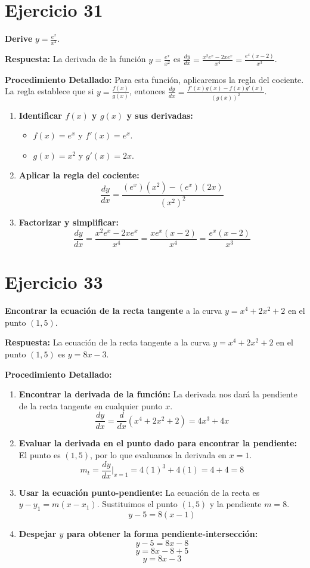 \documentclass[12pt, a4paper]{article}
\begin{document}
\section{Ejercicio 31}
\textbf{Derive} $y = \frac{e^x}{x^2}$.

\textbf{Respuesta:}
La derivada de la función $y=\frac{e^x}{x^2}$ es $\frac{dy}{dx} = \frac{x^2e^x-2xe^x}{x^4} = \frac{e^x(x-2)}{x^3}$.

\textbf{Procedimiento Detallado:}
Para esta función, aplicaremos la regla del cociente. La regla establece que si $y=\frac{f(x)}{g(x)}$, entonces $\frac{dy}{dx}=\frac{f'(x)g(x)-f(x)g'(x)}{(g(x))^2}$.
\begin{enumerate}
    \item \textbf{Identificar $f(x)$ y $g(x)$ y sus derivadas:}
    \begin{itemize}
        \item $f(x)=e^x$ y $f'(x)=e^x$.
        \item $g(x)=x^2$ y $g'(x)=2x$.
    \end{itemize}
    \item \textbf{Aplicar la regla del cociente:}
    \[\frac{dy}{dx}=\frac{(e^x)(x^2)-(e^x)(2x)}{(x^2)^2}\]
    \item \textbf{Factorizar y simplificar:}
    \[\frac{dy}{dx}=\frac{x^2e^x-2xe^x}{x^4}=\frac{xe^x(x-2)}{x^4}=\frac{e^x(x-2)}{x^3}\]
\end{enumerate}

\section{Ejercicio 33}
\textbf{Encontrar la ecuación de la recta tangente} a la curva $y=x^4+2x^2+2$ en el punto $(1,5)$.

\textbf{Respuesta:}
La ecuación de la recta tangente a la curva $y=x^4+2x^2+2$ en el punto $(1,5)$ es $y=8x-3$.

\textbf{Procedimiento Detallado:}
\begin{enumerate}
    \item \textbf{Encontrar la derivada de la función:} La derivada nos dará la pendiente de la recta tangente en cualquier punto $x$.
    \[\frac{dy}{dx}=\frac{d}{dx}(x^4+2x^2+2) = 4x^3+4x\]
    \item \textbf{Evaluar la derivada en el punto dado para encontrar la pendiente:} El punto es $(1,5)$, por lo que evaluamos la derivada en $x=1$.
    \[m_t=\frac{dy}{dx}\Big|_{x=1}=4(1)^3+4(1)=4+4=8\]
    \item \textbf{Usar la ecuación punto-pendiente:} La ecuación de la recta es $y-y_1=m(x-x_1)$. Sustituimos el punto $(1,5)$ y la pendiente $m=8$.
    \[y-5=8(x-1)\]
    \item \textbf{Despejar $y$ para obtener la forma pendiente-intersección:}
    \[y-5=8x-8\]
    \[y=8x-8+5\]
    \[y=8x-3\]
\end{enumerate}
\end{document}
